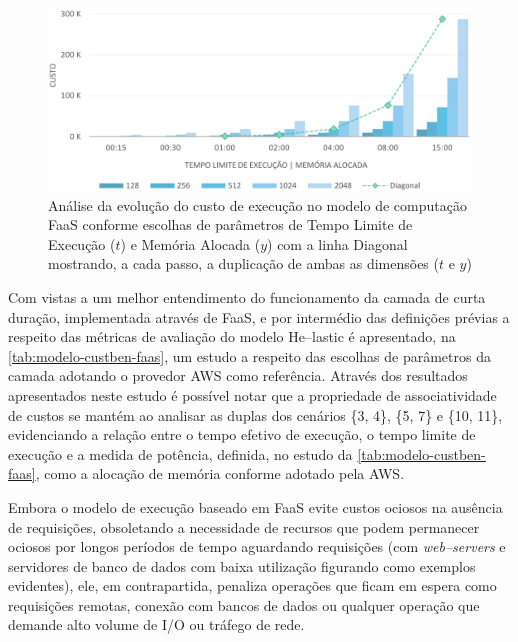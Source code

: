 \documentclass[english,brazilian]{UNISINOSmonografia} %
\newcommand\defaultFigureWidth{0.9}
\begin{document}
\begin{figure}[tb]
	\centering%
	\begin{minipage}{\defaultFigureWidth\textwidth}
		\caption[Análise da evolução do custo de execução no modelo de computação FaaS conforme escolhas de parâmetros de Tempo Limite de Execução ($t$) e Memória Alocada ($y$)]{Análise da evolução do custo de execução no modelo de computação FaaS conforme escolhas de parâmetros de Tempo Limite de Execução ($t$) e Memória Alocada ($y$) com a linha Diagonal mostrando, a cada passo, a duplicação de ambas as dimensões ($ t $ e $ y $)}
		\label{fig:modelo-custben-faas}
		\vspace{1ex}
		\includegraphics[width=\textwidth]{modelo-custben-faas}
	\end{minipage}
\end{figure}


Com vistas a um melhor entendimento do funcionamento da camada de curta duração, implementada através de FaaS, e por intermédio das definições prévias a respeito das métricas de avaliação do modelo \textsf{He}--lastic é apresentado, na \autoref{tab:modelo-custben-faas}, um estudo a respeito das escolhas de parâmetros da camada adotando o provedor AWS como referência.
Através dos resultados apresentados neste estudo é possível notar que a propriedade de associatividade de custos se mantém ao analisar as duplas dos cenários \{3, 4\}, \{5, 7\} e \{10, 11\}, evidenciando a relação entre o tempo efetivo de execução, o tempo limite de execução e a medida de potência, definida, no estudo da \autoref{tab:modelo-custben-faas}, como a alocação de memória conforme adotado pela AWS.


Embora o modelo de execução baseado em FaaS evite custos ociosos na ausência de requisições, obsoletando a necessidade de recursos que podem permanecer ociosos por longos períodos de tempo aguardando requisições (com \textit{web--servers} e servidores de banco de dados com baixa utilização figurando como exemplos evidentes), ele, em contrapartida, penaliza operações que ficam em espera como requisições remotas, conexão com bancos de dados ou qualquer operação que demande alto volume de I/O ou tráfego de rede.
\end{document}
